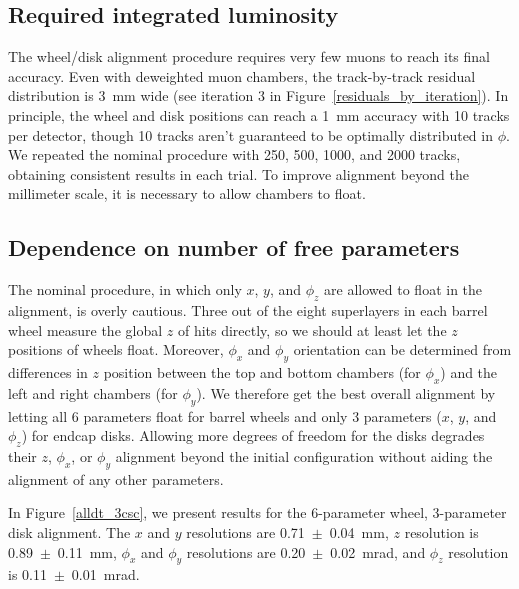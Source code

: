 \documentclass[12pt]{article}
\begin{document}
\subsection{Required integrated luminosity}

The wheel/disk alignment procedure requires very few muons to reach
its final accuracy.  Even with deweighted muon chambers, the
track-by-track residual distribution is 3~mm wide (see iteration 3 in
Figure~\ref{residuals_by_iteration}).  In principle, the wheel and
disk positions can reach a 1~mm accuracy with 10 tracks per detector,
though 10 tracks aren't guaranteed to be optimally distributed in
$\phi$.  We repeated the nominal procedure with 250, 500, 1000, and
2000 tracks, obtaining consistent results in each trial.  To improve
alignment beyond the millimeter scale, it is necessary to allow chambers to
float.

\subsection{Dependence on number of free parameters}

The nominal procedure, in which only $x$, $y$, and $\phi_z$ are
allowed to float in the alignment, is overly cautious.  Three out of
the eight superlayers in each barrel wheel measure the global $z$ of
hits directly, so we should at least let the $z$ positions of wheels
float.  Moreover, $\phi_x$ and $\phi_y$ orientation can be determined
from differences in $z$ position between the top and bottom chambers
(for $\phi_x$) and the left and right chambers (for $\phi_y$).  We
therefore get the best overall alignment by letting all 6 parameters
float for barrel wheels and only 3 parameters ($x$, $y$, and $\phi_z$)
for endcap disks.  Allowing more degrees of freedom for the disks
degrades their $z$, $\phi_x$, or $\phi_y$ alignment beyond the initial
configuration without aiding the alignment of any other parameters.

In Figure~\ref{alldt_3csc}, we present results for the 6-parameter
wheel, 3-parameter disk alignment.  The $x$ and $y$ resolutions are
0.71~$\pm$~0.04~mm, $z$ resolution is 0.89~$\pm$~0.11~mm, $\phi_x$ and
$\phi_y$ resolutions are 0.20~$\pm$~0.02~mrad, and $\phi_z$ resolution
is 0.11~$\pm$~0.01~mrad.
\end{document}
